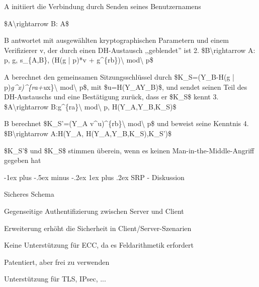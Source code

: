 \documentclass[a4paper]{article}
\makeatletter
\renewcommand{\subsubsection}{\@startsection{subsubsection}{3}{0mm}%
 {-1ex plus -.5ex minus -.2ex}%
 {1ex plus .2ex}%
 {\normalfont\small\bfseries}}
\makeatother
\begin{document}
\begin{multicols}{3}
      \begin{itemize*}
            \item A initiiert die Verbindung durch Senden seines Benutzernamens
            \begin{enumerate*}
                  \def\labelenumi{\arabic{enumi}.}
                  \item \$A\textbackslash rightarrow B: A\$
            \end{enumerate*}
            \item B antwortet mit ausgewählten kryptographischen Parametern und einem
            Verifizierer v, der durch einen DH-Austausch ,,geblendet'' ist 2.
            \$B\textbackslash rightarrow A: p, g, s\_\{A,B\}, (H(g
            \textbar| p)*v + g\^{}\{rb\})\textbackslash{}
            mod\textbackslash{} p\$
            \item A berechnet den gemeinsamen Sitzungsschlüssel durch \$K\_S=(Y\_B-H(g
            \textbar| p)\emph{g\^{}x)\^{}\{ra+u}x\}\textbackslash{}
            mod\textbackslash{} p\$, mit \$u=H(Y\_A\textbar\textbar Y\_B)\$, und
            sendet seinen Teil des DH-Austauschs und eine Bestätigung zurück, dass
            er \$K\_S\$ kennt 3. \$A\textbackslash rightarrow
            B:g\^{}\{ra\}\textbackslash{} mod\textbackslash{} p,
            H(Y\_A,Y\_B,K\_S)\$
            \item B berechnet \$K\_S'=(Y\_A v\^{}u)\^{}\{rb\}\textbackslash{}
            mod\textbackslash{} p\$ und beweist seine Kenntnis 4.
            \$B\textbackslash rightarrow A:H(Y\_A, H(Y\_A,Y\_B,K\_S),K\_S')\$
            \item \$K\_S'\$ und \$K\_S\$ stimmen überein, wenn es keinen
            Man-in-the-Middle-Angriff gegeben hat
      \end{itemize*}


      \subsubsection{SRP - Diskussion}

      \begin{itemize*}
            \item Sicheres Schema
            \begin{itemize*}
                  \item Gegenseitige Authentifizierung zwischen Server und Client
                  \item Erweiterung erhöht die Sicherheit in Client/Server-Szenarien
                  \item Keine Unterstützung für ECC, da es Feldarithmetik erfordert
            \end{itemize*}
            \item Patentiert, aber frei zu verwenden
            \item Unterstützung für TLS, IPsec, ...
      \end{itemize*}



\end{multicols}
\end{document}
